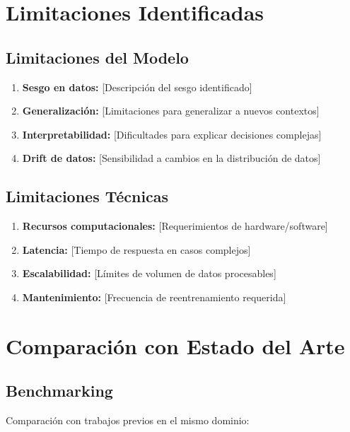 \section{Limitaciones Identificadas}

\subsection{Limitaciones del Modelo}

\begin{enumerate}
    \item \textbf{Sesgo en datos:} [Descripción del sesgo identificado]
    \item \textbf{Generalización:} [Limitaciones para generalizar a nuevos contextos]
    \item \textbf{Interpretabilidad:} [Dificultades para explicar decisiones complejas]
    \item \textbf{Drift de datos:} [Sensibilidad a cambios en la distribución de datos]
\end{enumerate}

\subsection{Limitaciones Técnicas}

\begin{enumerate}
    \item \textbf{Recursos computacionales:} [Requerimientos de hardware/software]
    \item \textbf{Latencia:} [Tiempo de respuesta en casos complejos]
    \item \textbf{Escalabilidad:} [Límites de volumen de datos procesables]
    \item \textbf{Mantenimiento:} [Frecuencia de reentrenamiento requerida]
\end{enumerate}

\section{Comparación con Estado del Arte}

\subsection{Benchmarking}

Comparación con trabajos previos en el mismo dominio:

